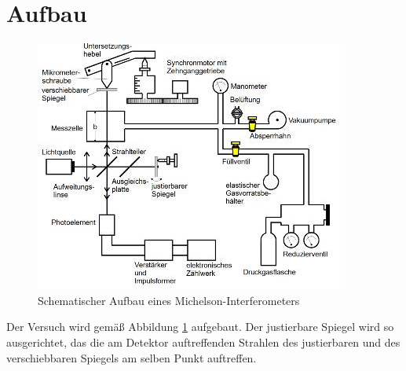\section{Aufbau}
\label{sec:Aufbau}

\begin{figure}
\centering
\includegraphics[scale=0.5]{content/images/aufbau.jpg}
\caption{Schematischer Aufbau eines Michelson-Interferometers\cite{V401}}
\label{fig:Aufbau}
\end{figure}

\noindent Der Versuch wird gemäß Abbildung \ref{fig:Aufbau} aufgebaut. Der justierbare Spiegel wird so ausgerichtet, das die am Detektor auftreffenden Strahlen des justierbaren und des verschiebbaren Spiegels
am selben Punkt auftreffen.